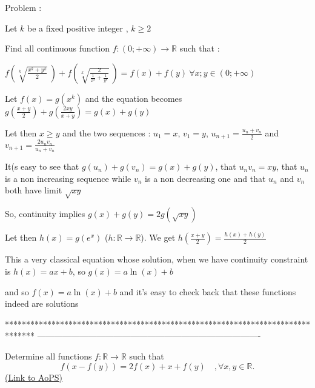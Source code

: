 \begin{solution}
	\begin{tcolorbox}\begin{italicized}    Problem :\end{italicized}

Let $ k$  be a fixed positive integer , $ k \ge 2$

  Find all continuous function $ f : ( 0 ; + \infty ) \to \mathbb{R}$ such that :

     $ f \left( \sqrt [k]{\frac {x^{k} + y^{k}}{2}} \ \right) + f \left(\sqrt [k]{\frac {2}{\frac {1}{x^{k}} + \frac {1}{y^{k}}}} \ \right) = f(x) + f(y) \ \forall x ;y \in ( 0 ; + \infty )$\end{tcolorbox}

Let $ f(x) = g(x^k)$ and the equation becomes $ g(\frac {x + y}2) + g(\frac {2xy}{x + y}) = g(x) + g(y)$

Let then $ x\ge y$ and the two sequences : $ u_1 = x$, $ v_1 = y$, $ u_{n + 1} = \frac {u_n + v_n}2$ and $ v_{n + 1} = \frac {2u_nv_n}{u_n + v_n}$ 

It(s easy to see that $ g(u_n) + g(v_n) = g(x) + g(y)$, that $ u_nv_n = xy$, that $ u_n$ is a non increasing sequence while $ v_n$ is a non decreasing one and that $ u_n$ and $ v_n$ both have limit $ \sqrt {xy}$

So, continuity implies $ g(x) + g(y) = 2g(\sqrt {xy})$

Let then $ h(x) = g(e^x)$ ($ h: \mathbb R\to\mathbb R$). We get $ h(\frac {x + y}2) = \frac {h(x) + h(y)}2$

This a very classical equation whose solution, when we have continuity constraint is $ h(x) = ax + b$, so $ g(x) = a\ln(x) + b$

and so $ \boxed{f(x) = a\ln(x) + b}$ and it's easy to check back that these functions indeed are solutions
\end{solution}
*******************************************************************************
-------------------------------------------------------------------------------

\begin{problem}
	Determine all functions $f: \mathbb R \to \mathbb R$ such that
\[f(x-f(y))=2f(x)+x+f(y)\quad, \forall x,y \in \mathbb R.\]
	\flushright \href{https://artofproblemsolving.com/community/c6h313494}{(Link to AoPS)}
\end{problem}



